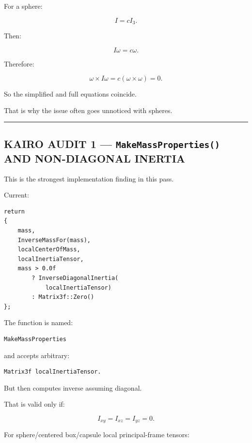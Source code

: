 For a sphere:

\[
I=cI_3.
\]

Then:

\[
I\omega=c\omega.
\]

Therefore:

\[
\omega\times I\omega
=
c(\omega\times\omega)
=
0.
\]

So the simplified and full equations coincide.

That is why the issue often goes unnoticed with spheres.

\begin{center}\rule{0.5\linewidth}{0.5pt}\end{center}

\subsection{\texorpdfstring{KAIRO AUDIT 1 --- \texttt{MakeMassProperties()} AND NON-DIAGONAL INERTIA}{KAIRO AUDIT 1 --- MakeMassProperties() AND NON-DIAGONAL INERTIA}}\label{06-engine-ii-ch035-kairo-audit-1-makemassproperties-and-non-diagonal-inertia}

\hypertarget{06-engine-ii-ch035-kairo-audit-1-makemassproperties-and-non-diagonal-inertia}{}

This is the strongest implementation finding in this pass.

Current:

\begin{verbatim}
return
{
    mass,
    InverseMassFor(mass),
    localCenterOfMass,
    localInertiaTensor,
    mass > 0.0f
        ? InverseDiagonalInertia(
            localInertiaTensor)
        : Matrix3f::Zero()
};
\end{verbatim}

The function is named:

\begin{verbatim}
MakeMassProperties
\end{verbatim}

and accepts arbitrary:

\begin{verbatim}
Matrix3f localInertiaTensor.
\end{verbatim}

But then computes inverse assuming diagonal.

That is valid only if:

\[
I_{xy}=I_{xz}=I_{yz}=0.
\]

For sphere/centered box/capsule local principal-frame tensors:

